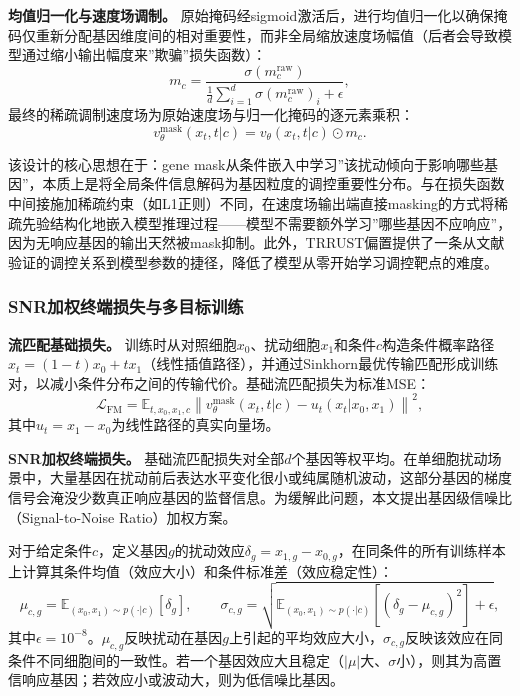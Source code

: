 \textbf{均值归一化与速度场调制。} 原始掩码经sigmoid激活后，进行均值归一化以确保掩码仅重新分配基因维度间的相对重要性，而非全局缩放速度场幅值（后者会导致模型通过缩小输出幅度来”欺骗”损失函数）：
\begin{equation}
m_c=\frac{\sigma(m_c^{\mathrm{raw}})}{\frac{1}{d}\sum_{i=1}^{d}\sigma(m_c^{\mathrm{raw}})_i+\epsilon},
\label{eq:mask_norm}
\end{equation}
最终的稀疏调制速度场为原始速度场与归一化掩码的逐元素乘积：
\begin{equation}
v_\theta^{\mathrm{mask}}(x_t,t|c)=v_\theta(x_t,t|c)\odot m_c.
\label{eq:masked_velocity}
\end{equation}

该设计的核心思想在于：gene mask从条件嵌入中学习”该扰动倾向于影响哪些基因”，本质上是将全局条件信息解码为基因粒度的调控重要性分布。与在损失函数中间接施加稀疏约束（如L1正则）不同，在速度场输出端直接masking的方式将稀疏先验结构化地嵌入模型推理过程——模型不需要额外学习”哪些基因不应响应”，因为无响应基因的输出天然被mask抑制。此外，TRRUST偏置提供了一条从文献验证的调控关系到模型参数的捷径，降低了模型从零开始学习调控靶点的难度。

\subsubsection{SNR加权终端损失与多目标训练}

\textbf{流匹配基础损失。} 训练时从对照细胞$x_0$、扰动细胞$x_1$和条件$c$构造条件概率路径$x_t=(1-t)x_0+tx_1$（线性插值路径），并通过Sinkhorn最优传输匹配形成训练对，以减小条件分布之间的传输代价。基础流匹配损失为标准MSE：
\begin{equation}
\mathcal{L}_{\mathrm{FM}}=\mathbb{E}_{t,x_0,x_1,c}\left\|v_\theta^{\mathrm{mask}}(x_t,t|c)-u_t(x_t|x_0,x_1)\right\|^2,
\label{eq:loss_fm}
\end{equation}
其中$u_t=x_1-x_0$为线性路径的真实向量场。

\textbf{SNR加权终端损失。} 基础流匹配损失对全部$d$个基因等权平均。在单细胞扰动场景中，大量基因在扰动前后表达水平变化很小或纯属随机波动，这部分基因的梯度信号会淹没少数真正响应基因的监督信息。为缓解此问题，本文提出基因级信噪比（Signal-to-Noise Ratio）加权方案。

对于给定条件$c$，定义基因$g$的扰动效应$\delta_g=x_{1,g}-x_{0,g}$，在同条件的所有训练样本上计算其条件均值（效应大小）和条件标准差（效应稳定性）：
\begin{equation}
\mu_{c,g}=\mathbb{E}_{(x_0,x_1)\sim p(\cdot|c)}[\delta_g],\qquad
\sigma_{c,g}=\sqrt{\mathbb{E}_{(x_0,x_1)\sim p(\cdot|c)}[(\delta_g-\mu_{c,g})^2]+\epsilon},
\label{eq:snr_stats}
\end{equation}
其中$\epsilon=10^{-8}$。$\mu_{c,g}$反映扰动在基因$g$上引起的平均效应大小，$\sigma_{c,g}$反映该效应在同条件不同细胞间的一致性。若一个基因效应大且稳定（$|\mu|$大、$\sigma$小），则其为高置信响应基因；若效应小或波动大，则为低信噪比基因。

